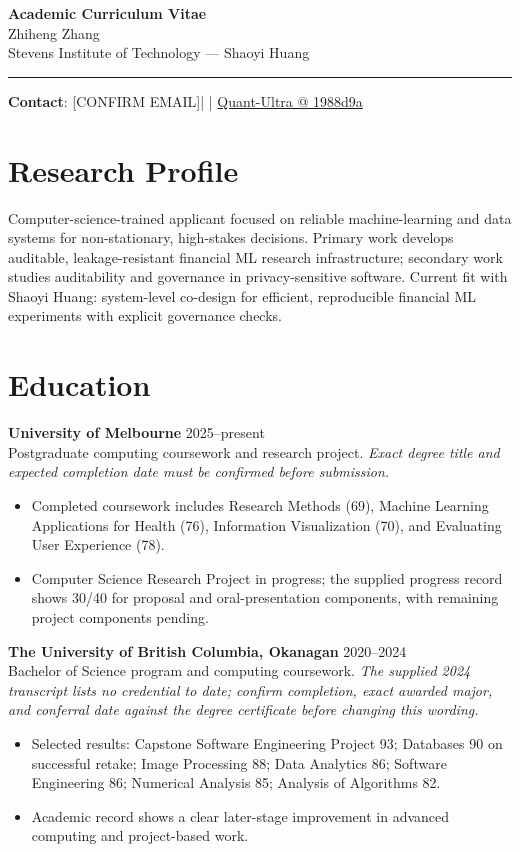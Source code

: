 \documentclass[11pt]{article}
\makeatletter
\newcommand{\ApplicantName}{Zhiheng Zhang}
\newcommand{\ApplicantEmail}{[CONFIRM EMAIL]}
\newcommand{\ApplicantPhone}{[CONFIRM PHONE]}
\newcommand{\ApplicantGitHub}{\href{https://github.com/zhiheng-zhang-Mera/Quant-Ultra/tree/1988d9a8530da91a8158de864d098ea869098923}{Quant-Ultra @ 1988d9a}}
\makeatother
\begin{document}
\begin{center}
{\LARGE\bfseries Academic Curriculum Vitae}\\[0.25em]
{\large \ApplicantName}\\
Stevens Institute of Technology --- Shaoyi Huang
\end{center}
\vspace{0.35em}\hrule\vspace{0.65em}

\textbf{Contact}: \ApplicantEmail\quad | \quad \ApplicantPhone\quad | \quad \ApplicantGitHub

\section*{Research Profile}
Computer-science-trained applicant focused on reliable machine-learning and data systems for non-stationary, high-stakes decisions. Primary work develops auditable, leakage-resistant financial ML research infrastructure; secondary work studies auditability and governance in privacy-sensitive software. Current fit with Shaoyi Huang: system-level co-design for efficient, reproducible financial ML experiments with explicit governance checks.

\section*{Education}
\textbf{University of Melbourne} \hfill 2025--present\\
Postgraduate computing coursework and research project. \textit{Exact degree title and expected completion date must be confirmed before submission.}
\begin{itemize}
\item Completed coursework includes Research Methods (69), Machine Learning Applications for Health (76), Information Visualization (70), and Evaluating User Experience (78).
\item Computer Science Research Project in progress; the supplied progress record shows 30/40 for proposal and oral-presentation components, with remaining project components pending.
\end{itemize}

\textbf{The University of British Columbia, Okanagan} \hfill 2020--2024\\
Bachelor of Science program and computing coursework. \textit{The supplied 2024 transcript lists no credential to date; confirm completion, exact awarded major, and conferral date against the degree certificate before changing this wording.}
\begin{itemize}
\item Selected results: Capstone Software Engineering Project 93; Databases 90 on successful retake; Image Processing 88; Data Analytics 86; Software Engineering 86; Numerical Analysis 85; Analysis of Algorithms 82.
\item Academic record shows a clear later-stage improvement in advanced computing and project-based work.
\end{itemize}
\end{document}
